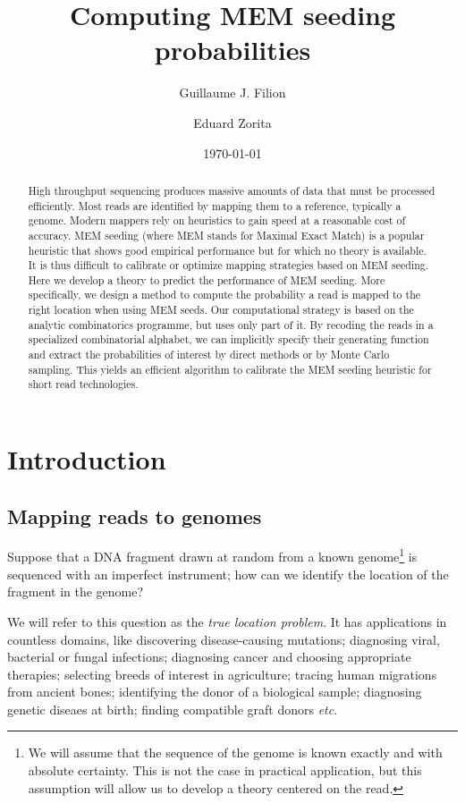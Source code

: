 \documentclass{article}
\title{Computing MEM seeding probabilities}
\author[1,2]{Guillaume J. Filion}
\author[1,2]{Eduard Zorita}
\affil[1]{Genome Architecture, Gene Regulation, Stem Cells and Cancer
Programme, Center for Genomic Regulation (CRG), The Barcelona Institute of
Science and Technology, Dr. Aiguader 88, Barcelona 08003, Spain.}
\affil[2]{University Pompeu Fabra, Doctor Aiguader, 08003 Barcelona,
Spain.}
\date{\today}
\begin{document}
\maketitle

\begin{abstract}
High throughput sequencing produces massive amounts of data that must be
processed efficiently. Most reads are identified by mapping them to a
reference, typically a genome. Modern mappers rely on heuristics to gain
speed at a reasonable cost of accuracy. MEM seeding (where MEM stands for
Maximal Exact Match) is a popular heuristic that shows good empirical
performance but for which no theory is available. It is thus difficult to
calibrate or optimize mapping strategies based on MEM seeding. Here we
develop a theory to predict the performance of MEM seeding. More
specifically, we design a method to compute the probability a read is
mapped to the right location when using MEM seeds. Our computational
strategy is based on the analytic combinatorics programme, but uses only
part of it. By recoding the reads in a specialized combinatorial alphabet,
we can implicitly specify their generating function and extract the
probabilities of interest by direct methods or by Monte Carlo sampling.
This yields an efficient algorithm to calibrate the MEM seeding heuristic
for short read technologies.
\end{abstract}



\section{Introduction}

\subsection{Mapping reads to genomes}

Suppose that a DNA fragment drawn at random from a known
genome\footnote{We will assume that the sequence of the genome is known
exactly and with absolute certainty. This is not the case in practical
application, but this assumption will allow us to develop a theory
centered on the read.} is sequenced with an imperfect instrument; how can
we identify the location of the fragment in the genome?

We will refer to this question as the \emph{true location problem}.
It has applications in countless domains, like discovering
disease-causing mutations; diagnosing viral, bacterial or fungal
infections; diagnosing cancer and choosing appropriate therapies;
selecting breeds of interest in agriculture; tracing human migrations from
ancient bones; identifying the donor of a biological sample; diagnosing
genetic diseaes at birth; finding compatible graft donors \textit{etc}.
\end{document}
